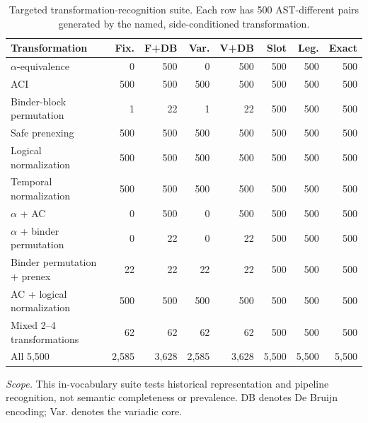 \begin{table}[H]
\centering
\caption{Targeted transformation-recognition suite. Each row has 500 AST-different pairs
generated by the named, side-conditioned transformation.}
\label{tab:capability-benchmark}
\scriptsize
\setlength{\tabcolsep}{1.55pt}
\begin{tabular}{@{}lrrrrrrr@{}}
\toprule
Transformation & Fix. & F+DB & Var. & V+DB & Slot & Leg. & Exact\\
\midrule
$\alpha$-equivalence & 0 & 500 & 0 & 500 & 500 & 500 & 500\\
ACI & 500 & 500 & 500 & 500 & 500 & 500 & 500\\
Binder-block permutation & 1 & 22 & 1 & 22 & 500 & 500 & 500\\
Safe prenexing & 500 & 500 & 500 & 500 & 500 & 500 & 500\\
Logical normalization & 500 & 500 & 500 & 500 & 500 & 500 & 500\\
Temporal normalization & 500 & 500 & 500 & 500 & 500 & 500 & 500\\
$\alpha$ + AC & 0 & 500 & 0 & 500 & 500 & 500 & 500\\
$\alpha$ + binder permutation & 0 & 22 & 0 & 22 & 500 & 500 & 500\\
Binder permutation + prenex & 22 & 22 & 22 & 22 & 500 & 500 & 500\\
AC + logical normalization & 500 & 500 & 500 & 500 & 500 & 500 & 500\\
Mixed 2--4 transformations & 62 & 62 & 62 & 62 & 500 & 500 & 500\\
\midrule
All 5,500 & 2,585 & 3,628 & 2,585 & 3,628 & 5,500 & 5,500 & 5,500\\
\bottomrule
\end{tabular}

\parbox{0.97\linewidth}{\footnotesize\emph{Scope.} This in-vocabulary
suite tests historical representation and pipeline recognition, not semantic
completeness or prevalence. DB denotes De Bruijn encoding; Var. denotes the
variadic core.}
\end{table}
